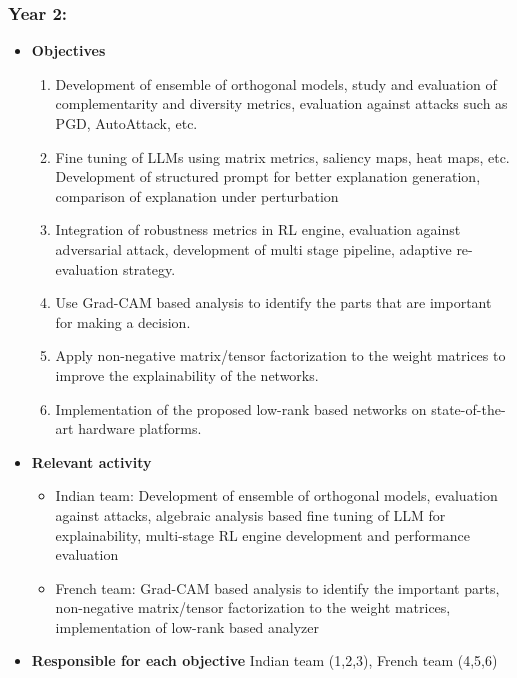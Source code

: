 \documentclass[a4paper,11pt]{article}
\begin{document}
\subsubsection*{Year 2:}
\begin{itemize}
	\item \textbf{Objectives}
	\begin{enumerate}
		\item Development of ensemble of orthogonal models, study and evaluation of complementarity and diversity metrics, evaluation against attacks such as PGD, AutoAttack, etc.
		\item Fine tuning of LLMs using matrix metrics, saliency maps, heat maps, etc. Development of structured prompt for better explanation generation, comparison of explanation under perturbation
		\item Integration of robustness metrics in RL engine, evaluation against adversarial attack, development of multi stage pipeline, adaptive re-evaluation strategy.
		
		\item Use Grad-CAM based analysis to identify the parts that are important for making a decision.
		\item Apply non-negative matrix/tensor factorization to the weight matrices to improve the explainability of the networks.
		\item Implementation of the proposed low-rank based networks on state-of-the-art hardware platforms.
	\end{enumerate}
	\item \textbf{Relevant activity}
	\begin{itemize}
		\item Indian team: Development of ensemble of orthogonal models, evaluation against attacks, algebraic analysis based fine tuning of LLM for explainability, multi-stage RL engine development and performance evaluation
		\item French team: Grad-CAM based analysis to identify the important parts, non-negative matrix/tensor factorization to the weight matrices, implementation of low-rank based analyzer
	\end{itemize}
	\item \textbf{Responsible for each objective} Indian team (1,2,3), French team (4,5,6)
\end{itemize}
\end{document}
